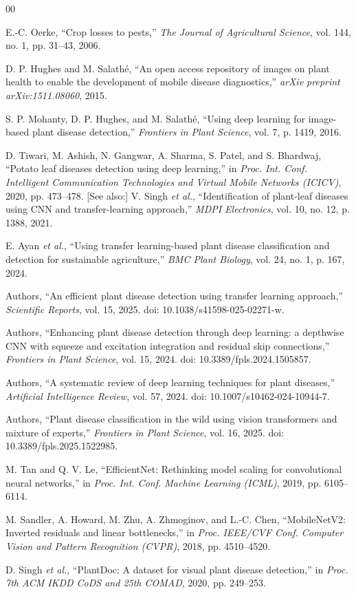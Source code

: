 \documentclass[10pt,twocolumn]{article}
\begin{document}
\begin{thebibliography}{00}

E.-C. Oerke, ``Crop losses to pests,'' \textit{The Journal of Agricultural Science}, vol. 144, no. 1, pp. 31--43, 2006.

D. P. Hughes and M. Salath\'{e}, ``An open access repository of images on plant health to enable the development of mobile disease diagnostics,'' \textit{arXiv preprint arXiv:1511.08060}, 2015.

S. P. Mohanty, D. P. Hughes, and M. Salath\'{e}, ``Using deep learning for image-based plant disease detection,'' \textit{Frontiers in Plant Science}, vol. 7, p. 1419, 2016.

D. Tiwari, M. Ashish, N. Gangwar, A. Sharma, S. Patel, and S. Bhardwaj, ``Potato leaf diseases detection using deep learning,'' in \textit{Proc. Int. Conf. Intelligent Communication Technologies and Virtual Mobile Networks (ICICV)}, 2020, pp. 473--478. [See also:] V. Singh \textit{et al.}, ``Identification of plant-leaf diseases using CNN and transfer-learning approach,'' \textit{MDPI Electronics}, vol. 10, no. 12, p. 1388, 2021.

E. Ayan \textit{et al.}, ``Using transfer learning-based plant disease classification and detection for sustainable agriculture,'' \textit{BMC Plant Biology}, vol. 24, no. 1, p. 167, 2024.

Authors, ``An efficient plant disease detection using transfer learning approach,'' \textit{Scientific Reports}, vol. 15, 2025. doi: 10.1038/s41598-025-02271-w.

Authors, ``Enhancing plant disease detection through deep learning: a depthwise CNN with squeeze and excitation integration and residual skip connections,'' \textit{Frontiers in Plant Science}, vol. 15, 2024. doi: 10.3389/fpls.2024.1505857.

Authors, ``A systematic review of deep learning techniques for plant diseases,'' \textit{Artificial Intelligence Review}, vol. 57, 2024. doi: 10.1007/s10462-024-10944-7.

Authors, ``Plant disease classification in the wild using vision transformers and mixture of experts,'' \textit{Frontiers in Plant Science}, vol. 16, 2025. doi: 10.3389/fpls.2025.1522985.

M. Tan and Q. V. Le, ``EfficientNet: Rethinking model scaling for convolutional neural networks,'' in \textit{Proc. Int. Conf. Machine Learning (ICML)}, 2019, pp. 6105--6114.

M. Sandler, A. Howard, M. Zhu, A. Zhmoginov, and L.-C. Chen, ``MobileNetV2: Inverted residuals and linear bottlenecks,'' in \textit{Proc. IEEE/CVF Conf. Computer Vision and Pattern Recognition (CVPR)}, 2018, pp. 4510--4520.

D. Singh \textit{et al.}, ``PlantDoc: A dataset for visual plant disease detection,'' in \textit{Proc. 7th ACM IKDD CoDS and 25th COMAD}, 2020, pp. 249--253.

\end{thebibliography}
\end{document}
